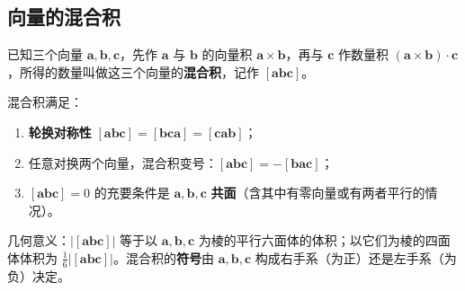 \subsection{向量的混合积}

\begin{definition}
已知三个向量 $\boldsymbol{a},\boldsymbol{b},\boldsymbol{c}$，先作 $\boldsymbol{a}$ 与 $\boldsymbol{b}$ 的向量积 $\boldsymbol{a}\times\boldsymbol{b}$，再与 $\boldsymbol{c}$ 作数量积 $(\boldsymbol{a}\times\boldsymbol{b})\cdot\boldsymbol{c}$，所得的数量叫做这三个向量的\textbf{混合积}，记作 $[\boldsymbol{a}\boldsymbol{b}\boldsymbol{c}]$。
\end{definition}


\begin{property}
混合积满足：
\begin{enumerate}
\item \textbf{轮换对称性} $[\boldsymbol{a}\boldsymbol{b}\boldsymbol{c}]=[\boldsymbol{b}\boldsymbol{c}\boldsymbol{a}]=[\boldsymbol{c}\boldsymbol{a}\boldsymbol{b}]$；
\item 任意对换两个向量，混合积变号：$[\boldsymbol{a}\boldsymbol{b}\boldsymbol{c}]=-[\boldsymbol{b}\boldsymbol{a}\boldsymbol{c}]$；
\item $[\boldsymbol{a}\boldsymbol{b}\boldsymbol{c}]=0$ 的充要条件是 $\boldsymbol{a},\boldsymbol{b},\boldsymbol{c}$ \textbf{共面}（含其中有零向量或有两者平行的情况）。
\end{enumerate}
\end{property}

几何意义：$|[\boldsymbol{a}\boldsymbol{b}\boldsymbol{c}]|$ 等于以 $\boldsymbol{a},\boldsymbol{b},\boldsymbol{c}$ 为棱的平行六面体的体积；以它们为棱的四面体体积为 $\frac16|[\boldsymbol{a}\boldsymbol{b}\boldsymbol{c}]|$。混合积的\textbf{符号}由 $\boldsymbol{a},\boldsymbol{b},\boldsymbol{c}$ 构成右手系（为正）还是左手系（为负）决定。


